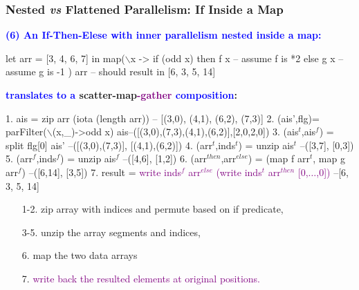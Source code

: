\documentclass{beamer}
\newcommand{\blue}[1]{\textcolor{Blue}{{#1}}}
\newcommand{\purple}[1]{\textcolor{Purple}{{#1}}}
\renewcommand{\emph}[1]{\textcolor{structure}{#1}}
\newcommand{\emp}[1]{\textcolor{DikuRed}{ #1}}
\newcommand{\mymath}[1]{$ #1 $}
\newcommand{\myindu}[1]{^{#1}}
\begin{document}
\begin{frame}[fragile,t]
  \frametitle{Nested {\it vs} Flattened Parallelism: If Inside a Map}

\blue{\bf (6) An If-Then-Elese with inner parallelism nested inside a map:} 

\begin{colorcode}[fontsize=\scriptsize]
let arr = [3, 4, 6, 7] in
map(\mymath{\backslash}x -> if (odd x)  then f x  -- assume f is *2
                      else g x  -- assume g is -1 ) arr 
-- should result in [6, 3, 5, 14]
\end{colorcode}

\bigskip
\pause

\textbf{\blue{translates to a} \emp{scatter-}\emph{map}\purple{-gather} \blue{composition}:}
\bigskip

\begin{colorcode}[fontsize=\scriptsize]
1. ais = zip arr (iota (length arr))      -- [(3,0), (4,1), (6,2), (7,3)]
2. (ais',flg)=\emp{parFilter}(\mymath{\backslash}(x,_)->odd x) ais--([(3,0),(7,3),(4,1),(6,2)],[2,0,2,0])
3. (ais\mymath{\myindu{t}},ais\mymath{\myindu{f}}) = split flg[0] ais'        --([(3,0),(7,3)], [(4,1),(6,2)])
4. (arr\mymath{\myindu{t}},inds\mymath{\myindu{t}}) = unzip ais\mymath{\myindu{t}}                 --([3,7], [0,3])
5. (arr\mymath{\myindu{f}},inds\mymath{\myindu{f}}) = unzip ais\mymath{\myindu{f}}                 --([4,6], [1,2])
6. (arr\mymath{\myindu{then}},arr\mymath{\myindu{else}}) = (\emph{map f arr\mymath{\myindu{t}}, map g arr\mymath{\myindu{f}}}) --([6,14], [3,5])
7. result = \purple{write inds\mymath{\myindu{f}} arr\mymath{\myindu{else}} (write inds\mymath{\myindu{t}} arr\mymath{\myindu{then}} [0,\mymath{\ldots},0])} --[6, 3, 5, 14]
\end{colorcode}

\bigskip

\begin{itemize}
    \item[1-2.] zip array with indices and \emp{permute based on if predicate},
    \item[3-5.] unzip the array segments and indices,
    \item[6.] \emph{map the two data arrays}
    \item[7.] \purple{write back the resulted elements at original positions.}
\end{itemize}

\end{frame}
\end{document}
